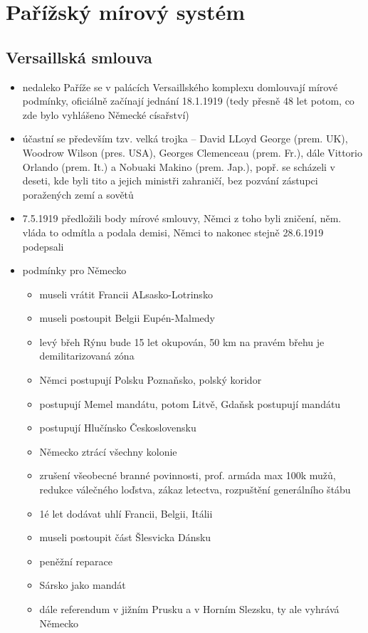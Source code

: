 \documentclass{article}
\begin{document}
\section{Pařížský mírový systém}

\subsection{Versaillská smlouva}
\begin{itemize}
  \item nedaleko Paříže se v palácích Versaillského komplexu domlouvají mírové podmínky, oficiálně začínají jednání 18.1.1919 (tedy přesně 48 let potom, co zde bylo vyhlášeno Německé císařství)
  \item účastní se především tzv. velká trojka -- David LLoyd George (prem. UK), Woodrow Wilson (pres. USA), Georges Clemenceau (prem. Fr.), dále Vittorio Orlando (prem. It.) a Nobuaki Makino (prem. Jap.), popř. se scházeli v deseti, kde byli tito a jejich ministři zahraničí, bez pozvání zástupci poražených zemí a sovětů
  \item 7.5.1919 předložili body mírové smlouvy, Němci z toho byli zničení, něm. vláda to odmítla a podala demisi, Němci to nakonec stejně 28.6.1919 podepsali
  \item podmínky pro Německo
  \begin{itemize}
    \item museli vrátit Francii ALsasko-Lotrinsko
    \item museli postoupit Belgii Eupén-Malmedy
    \item levý břeh Rýnu bude 15 let okupován, 50 km na pravém břehu je demilitarizovaná zóna
    \item Němci postupují Polsku Poznaňsko, polský koridor
    \item postupují Memel mandátu, potom Litvě, Gdaňsk postupují mandátu
    \item postupují Hlučínsko Československu
    \item Německo ztrácí všechny kolonie
    \item zrušení všeobecné branné povinnosti, prof. armáda max 100k mužů, redukce válečného loďstva, zákaz letectva, rozpuštění generálního štábu
    \item 1é let dodávat uhlí Francii, Belgii, Itálii
    \item museli postoupit část Šlesvicka Dánsku
    \item peněžní reparace
    \item Sársko jako mandát
    \item dále referendum v jižním Prusku a v Horním Slezsku, ty ale vyhrává Německo
  \end{itemize}
\end{itemize}
\end{document}

